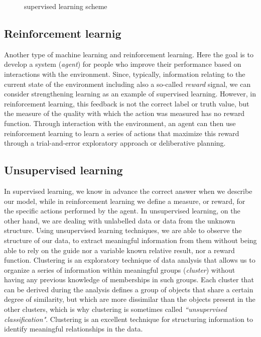 \begin{figure}
\centering
{} 
\caption{supervised learning scheme} 
\label{fig:supervised-learning-scheme}
\end{figure}

\subsection{Reinforcement learnig}\label{subsec:reinforcement-learnig}
Another type of machine learning and reinforcement learning.
Here the goal is to develop a system (\emph{agent}) for people who improve
their performance based on interactions with the environment.
Since, typically, information relating to the current state of the environment
including also a so-called \emph{reward} signal, we can consider strengthening
learning as an example of supervised learning.
However, in reinforcement learning, this feedback is not the correct label or
truth value, but the measure of the quality with which the action was measured
has no reward function.
Through interaction with the environment, an agent can then use reinforcement
learning to learn a series of actions that maximize this reward through a
trial-and-error exploratory approach or deliberative planning.\cite{raschka2016machine}

\subsection{Unsupervised learning}\label{subsec:unsupervised-learning}
In supervised learning, we know in advance the correct answer when we describe
our model, while in reinforcement learning we define a measure, or reward, for
the specific actions performed by the agent.
In unsupervised learning, on the other hand, we are dealing with unlabelled data
or data from the unknown structure.
Using unsupervised learning techniques, we are able to observe the structure of
our data, to extract meaningful information from them without being able to
rely on the guide nor a variable known relative result, nor a reward function.
Clustering is an exploratory technique of data analysis that allows us to
organize a series of information within meaningful groups (\emph{cluster})
without having any previous knowledge of memberships in such groups.
Each cluster that can be derived during the analysis defines a group of objects
that share a certain degree of similarity, but which are more dissimilar than
the objects present in the other clusters, which is why clustering is sometimes
called \emph{``unsupervised classification"}.
Clustering is an excellent technique for structuring information to identify
meaningful relationships in the data.\cite{raschka2016machine}




